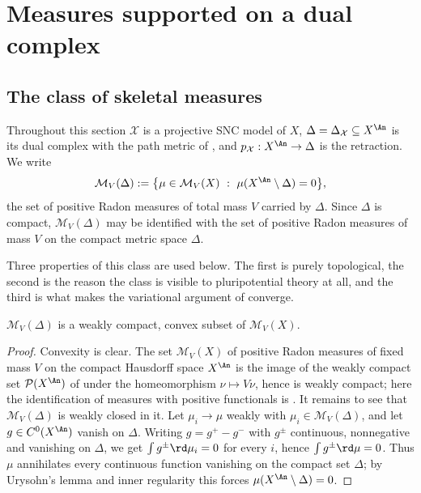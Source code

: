 \section{Measures supported on a dual complex}
\label{sec:ch29-supported}

\subsection{The class of skeletal measures}
\label{sec:ch29-skeletal-class}

Throughout this section $\mathcal X$ is a projective SNC model of $X$,
$\Delta=\Delta_{\mathcal X}\subseteq X^{\An}$ is its dual complex with the
path metric of , and
$p_{\mathcal X}:X^{\An}\to\Delta$ is the retraction.  We write
\begin{equation}
\label{eq:ch29-skeletal-measures}
 \mathcal M_V(\Delta)
 :=\bigl\{\mu\in\mathcal M_V(X)\ :\ \mu(X^{\An}\setminus\Delta)=0\bigr\},
\end{equation}
the set of positive Radon measures of total mass $V$ carried by
$\Delta$.  Since $\Delta$ is compact, $\mathcal M_V(\Delta)$ may be
identified with the set of positive Radon measures of mass $V$ on the
compact metric space $\Delta$.

Three properties of this class are used below.  The first is purely
topological, the second is the reason the class is visible to
pluripotential theory at all, and the third is what makes the variational
argument of  converge.

\begin{proposition}
\label{prop:ch29-skeletal-compact}
$\mathcal M_V(\Delta)$ is a weakly compact, convex subset of
$\mathcal M_V(X)$.
\end{proposition}

\begin{proof}
Convexity is clear.  The set $\mathcal M_V(X)$ of positive Radon measures
of fixed mass $V$ on the compact Hausdorff space $X^{\An}$ is the image
of the weakly compact set $\mathcal P(X^{\An})$ of
 under the homeomorphism
$\nu\mapsto V\nu$, hence is weakly compact; here the identification of
measures with positive functionals is
.  It remains to see that
$\mathcal M_V(\Delta)$ is weakly closed in it.  Let $\mu_i\to\mu$
weakly with $\mu_i\in\mathcal M_V(\Delta)$, and let
$g\in C^0(X^{\An})$ vanish on $\Delta$.  Writing
$g=g^+-g^-$ with $g^\pm$ continuous, nonnegative and vanishing on
$\Delta$, we get $\int g^\pm\rd\mu_i=0$ for every $i$, hence
$\int g^\pm\rd\mu=0$.  Thus $\mu$ annihilates every continuous function
vanishing on the compact set $\Delta$; by Urysohn's lemma and inner
regularity this forces $\mu(X^{\An}\setminus\Delta)=0$.
\end{proof}

